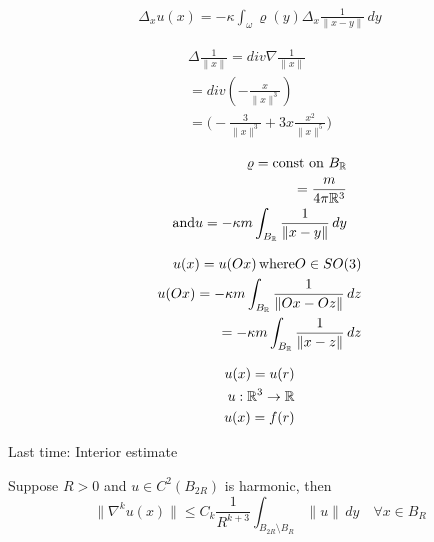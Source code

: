 \documentclass[11pt]{article}
\begin{document}
\begin{align*}
    \Delta_x u(x) = -\kappa \int_{\omega} \varrho(y) \Delta_x \frac{1}{\| x-y \| } \, dy
\end{align*}

\begin{align*}
    \Delta \frac{1}{\| x \| } = div \nabla \frac{1}{\| x \| }\\
                             = div(-\frac{x}{\| x \|^3 })\\
                             = \big(  -\frac{3}{\| x \|^3 } + 3x \frac{x^2}{\| x \|^5 }  \big)
\end{align*}

\begin{example}
    \begin{align*}
        \varrho = \text{const on } B_{\mathbb{R}} \\
            = \frac{m}{4 \pi \mathbb{R}^3} \\
        \text{and} u = -\kappa m \int_{B_{\mathbb{R}}} \frac{1}{\| x-y \| } \, dy
    \end{align*}
    \begin{claim}
        \begin{align*}
            u(x) = u(Ox) \, \text{where} O \in SO(3) \\
            u(Ox) = - \kappa m \int_{B_{\mathbb{R}}} \frac{1}{\| Ox - Oz \| } \, dz\\
                    = - \kappa m \int_{B_{\mathbb{R}}} \frac{1}{\| x - z \| } \, dz
        \end{align*}
    \end{claim}
    \begin{align*}
        u(x) = u(r) \\
        u: \mathbb{R}^3 \to \mathbb{R} \\
        u(x) = f(r)
    \end{align*}
\end{example}



\vspace{10mm}



Last time: Interior estimate

Suppose $R > 0$ and $u \in C^{2}(B_{2R})$ is harmonic, then
\begin{equation}
    \label{eq:1}
    \| \nabla^{k}u(x)  \| \le C_{k} \frac{1}{R^{k+3}} \int_{B_{2R}\setminus B_{R}}
    \| u \| \, dy \quad \forall  x \in B_{R}
\end{equation}
\end{document}
